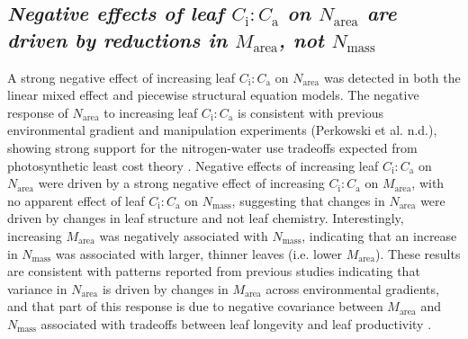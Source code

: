 \begin{singlespace}
\subsection{\textit{Negative effects of leaf $C_\mathrm{i}\mathrm{:}C_\mathrm{a}$ on $N_\mathrm{area}$ are driven by reductions in $M_\mathrm{area}$, not $N_\mathrm{mass}$}}
\end{singlespace}
\noindent A strong negative effect of increasing leaf $C_\mathrm{i}\mathrm{:}C_\mathrm{a}$ on $N_\mathrm{area}$ was detected in both the linear mixed effect and piecewise structural equation models. The negative response of $N_\mathrm{area}$ to increasing leaf $C_\mathrm{i}\mathrm{:}C_\mathrm{a}$ is consistent with previous environmental gradient  and manipulation experiments (Perkowski et al. n.d.), showing strong support for the nitrogen-water use tradeoffs expected from photosynthetic least cost theory . Negative effects of increasing leaf $C_\mathrm{i}\mathrm{:}C_\mathrm{a}$ on $N_\mathrm{area}$ were driven by a strong negative effect of increasing $C_\mathrm{i}\mathrm{:}C_\mathrm{a}$ on $M_\mathrm{area}$, with no apparent effect of leaf $C_\mathrm{i}\mathrm{:}C_\mathrm{a}$ on $N_\mathrm{mass}$, suggesting that changes in $N_\mathrm{area}$ were driven by changes in leaf structure and not leaf chemistry. Interestingly, increasing $M_\mathrm{area}$ was negatively associated with $N_\mathrm{mass}$, indicating that an increase in $N_\mathrm{mass}$ was associated with larger, thinner leaves (i.e. lower $M_\mathrm{area}$). These results are consistent with patterns reported from previous studies indicating that variance in $N_\mathrm{area}$ is driven by changes in $M_\mathrm{area}$ across environmental gradients, and that part of this response is due to negative covariance between $M_\mathrm{area}$ and $N_\mathrm{mass}$ associated with tradeoffs between leaf longevity and leaf productivity .

